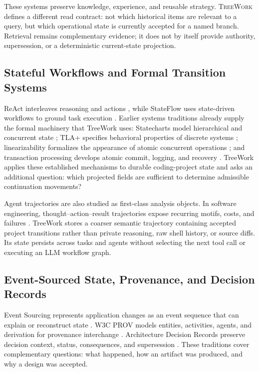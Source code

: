 \documentclass[11pt]{article}
\newcommand{\system}{\textsc{TreeWork}\xspace}
\theoremstyle{definition}
\begin{document}
These systems preserve knowledge, experience, and reusable strategy.  \system
defines a different read contract: not which historical items are relevant to
a query, but which operational state is currently accepted for a named branch.
Retrieval remains complementary evidence; it does not by itself provide
authority, supersession, or a deterministic current-state projection.

\subsection{Stateful Workflows and Formal Transition Systems}

ReAct interleaves reasoning and actions \citep{yao2023react}, while StateFlow
uses state-driven workflows to ground task execution \citep{wu2024stateflow}.
Earlier systems traditions already supply the formal machinery that TreeWork
uses: Statecharts model hierarchical and concurrent state
\citep{harel1987statecharts}; TLA+ specifies behavioral properties of discrete
systems \citep{lamport2002specifying}; linearizability formalizes the appearance
of atomic concurrent operations \citep{herlihy1990linearizability}; and
transaction processing develops atomic commit, logging, and recovery
\citep{gray1992transaction}.  TreeWork applies these established mechanisms to
durable coding-project state and asks an additional question:
which projected fields are sufficient to determine admissible continuation
movements?

Agent trajectories are also studied as first-class analysis objects.  In
software engineering, thought--action--result trajectories expose recurring
motifs, costs, and failures \citep{bouzenia2025trajectories}.  TreeWork stores a
coarser semantic trajectory containing accepted project transitions rather than
private reasoning, raw shell history, or source diffs.  Its state persists
across tasks and agents without selecting the next tool call or executing an
LLM workflow graph.

\subsection{Event-Sourced State, Provenance, and Decision Records}

Event Sourcing represents application changes as an event sequence that can
explain or reconstruct state \citep{fowler2005eventsourcing}.  W3C PROV models
entities, activities, agents, and derivation for provenance interchange
\citep{lebo2013provo}.  Architecture Decision Records preserve decision context,
status, consequences, and supersession \citep{nygard2011adr}.  These traditions
cover complementary questions: what happened, how an artifact was produced,
and why a design was accepted.
\end{document}
